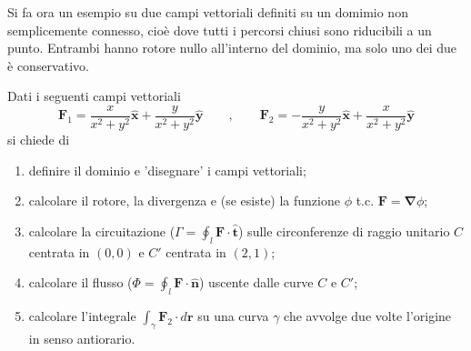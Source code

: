 \noindent
Si fa ora un esempio su due campi vettoriali definiti su un domimio non semplicemente connesso, cioè dove tutti i percorsi chiusi sono riducibili a un punto. Entrambi hanno rotore nullo all'interno del dominio, ma solo uno dei due è conservativo.
\begin{exercise}
Dati i seguenti campi vettoriali
\begin{equation}
 \bm{F}_1 =   \frac{x}{x^2+y^2} \bm{\hat{x}} + \frac{y}{x^2+y^2} \bm{\hat{y}} \qquad , \qquad
 \bm{F}_2 = - \frac{y}{x^2+y^2} \bm{\hat{x}} + \frac{x}{x^2+y^2} \bm{\hat{y}}
\end{equation}
si chiede di
\begin{enumerate}

\item definire il dominio e 'disegnare' i campi vettoriali;

\item calcolare il rotore, la divergenza e (se esiste) la funzione $\phi$ t.c. $\bm{F} = \bm{\nabla}\phi$;

\item calcolare la circuitazione ($\Gamma = \oint_l \bm{F} \cdot \bm{\hat{t}}$)  sulle
 circonferenze di raggio unitario $C$ centrata in $(0,0)$ e $C'$ centrata in $(2,1)$;

\item calcolare il flusso ($\Phi = \oint_l \bm{F} \cdot \bm{\hat{n}}$) uscente dalle curve $C$ e $C'$;	

\item calcolare l'integrale $\int_\gamma \bm{F}_2 \cdot d\bm{r}$ su una curva $\gamma$ che 
 avvolge due volte l'origine in senso antiorario.

\end{enumerate}
\end{exercise}


